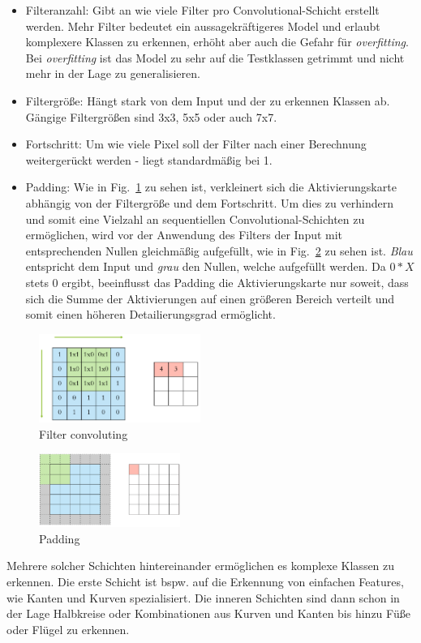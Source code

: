\begin{itemize}
  \item Filteranzahl: Gibt an wie viele Filter pro Convolutional-Schicht erstellt werden. Mehr Filter bedeutet ein aussagekräftigeres Model und erlaubt komplexere Klassen zu erkennen, erhöht aber auch die Gefahr für \textit{overfitting}. Bei \textit{overfitting} ist das Model zu sehr auf die Testklassen getrimmt und nicht mehr in der Lage zu generalisieren.
  \item Filtergröße: Hängt stark von dem Input und der zu erkennen Klassen ab. Gängige Filtergrößen sind 3x3, 5x5 oder auch 7x7. 
  \item Fortschritt: Um wie viele Pixel soll der Filter nach einer Berechnung weitergerückt werden - liegt standardmäßig bei 1.
  \item Padding: Wie in Fig.~\ref{fig-filter-moving} zu sehen ist, verkleinert sich die Aktivierungskarte abhängig von der Filtergröße und dem Fortschritt. Um dies zu verhindern und somit eine Vielzahl an sequentiellen Convolutional-Schichten zu ermöglichen, wird vor der Anwendung des Filters der Input mit entsprechenden Nullen gleichmäßig aufgefüllt, wie in Fig.~\ref{fig-padding} zu sehen ist. \textit{Blau} entspricht dem Input und \textit{grau} den Nullen, welche aufgefüllt werden. Da $0*X$ stets $0$ ergibt, beeinflusst das Padding die Aktivierungskarte nur soweit, dass sich die Summe der Aktivierungen auf einen größeren Bereich verteilt und somit einen höheren Detailierungsgrad ermöglicht.
\end{itemize}
\begin{figure}[htbp]
\centerline{\includegraphics[height=2.9cm]{img/filter-moving.png}}
\caption{Filter convoluting \cite{Dertat.2017}}
\label{fig-filter-moving}
\end{figure}
\begin{figure}[htbp]
\centerline{\includegraphics[height=2.4cm]{img/padding.png}}
\caption{Padding \cite{Dertat.2017}}
\label{fig-padding}
\end{figure}
Mehrere solcher Schichten hintereinander ermöglichen es komplexe Klassen zu erkennen. Die erste Schicht ist bspw. auf die Erkennung von einfachen Features, wie Kanten und Kurven spezialisiert. Die inneren Schichten sind dann schon in der Lage Halbkreise oder Kombinationen aus Kurven und Kanten bis hinzu Füße oder Flügel zu erkennen.
